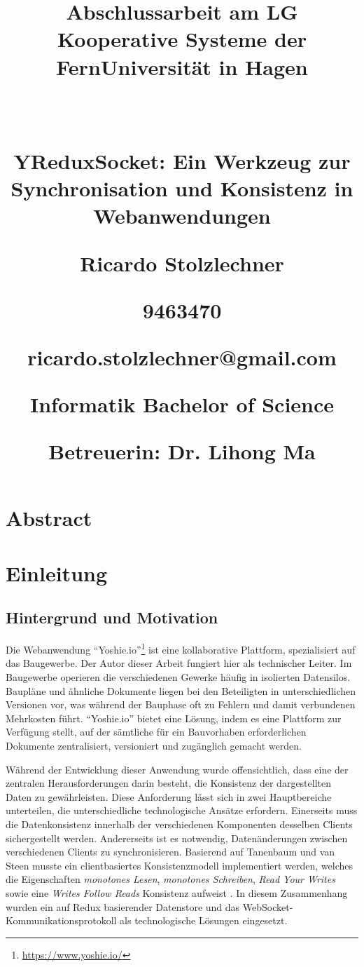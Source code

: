 \documentclass[12pt]{book}          %
\title{
\begin{center}
   \parskip1\baselineskip

   \large
   Abschlussarbeit am LG Kooperative Systeme der FernUniversität in Hagen
   
   ~
   
   \LARGE\bfseries 
    YReduxSocket: Ein Werkzeug zur Synchronisation und Konsistenz in Webanwendungen

   \large
   Ricardo Stolzlechner
   
   9463470
   
   ricardo.stolzlechner@gmail.com
   
   Informatik Bachelor of Science
   
   Betreuerin: Dr. Lihong Ma
\end{center}
}
\author{}
\begin{document}
\maketitle

\chapter*{Abstract}

\newpage

\tableofcontents
\listoffigures
\listofalgorithms

\newpage

\chapter{Einleitung}
\label{chap-einleitung}

\section{Hintergrund und Motivation}
\label{sec-hintergrund-und-motivation}

Die Webanwendung "`Yoshie.io"'\footnote{\url{https://www.yoshie.io/}} ist eine kollaborative Plattform, spezialisiert auf das Baugewerbe. Der Autor dieser Arbeit fungiert hier als technischer Leiter. Im Baugewerbe operieren die verschiedenen Gewerke häufig in isolierten Datensilos. Baupläne und ähnliche Dokumente liegen bei den Beteiligten in unterschiedlichen Versionen vor, was während der Bauphase oft zu Fehlern und damit verbundenen Mehrkosten führt. "`Yoshie.io"' bietet eine Lösung, indem es eine Plattform zur Verfügung stellt, auf der sämtliche für ein Bauvorhaben erforderlichen Dokumente zentralisiert, versioniert und zugänglich gemacht werden. 

Während der Entwicklung dieser Anwendung wurde offensichtlich, dass eine der zentralen Herausforderungen darin besteht, die Konsistenz der dargestellten Daten zu gewährleisten. Diese Anforderung lässt sich in zwei Hauptbereiche unterteilen, die unterschiedliche technologische Ansätze erfordern. Einerseits muss die Datenkonsistenz innerhalb der verschiedenen Komponenten desselben Clients sichergestellt werden. Andererseits ist es notwendig, Datenänderungen zwischen verschiedenen Clients zu synchronisieren. Basierend auf Tanenbaum und van Steen musste ein clientbasiertes Konsistenzmodell implementiert werden, welches die Eigenschaften \textit{monotones Lesen}, \textit{monotones Schreiben}, \textit{Read Your Writes} sowie eine \textit{Writes Follow Reads} Konsistenz aufweist \cite[322-325]{tanenbaum_verteilte_2008}. In diesem Zusammenhang wurden ein auf Redux basierender Datenstore und das WebSocket-Kommunikationsprotokoll als technologische Lösungen eingesetzt.
\end{document}
